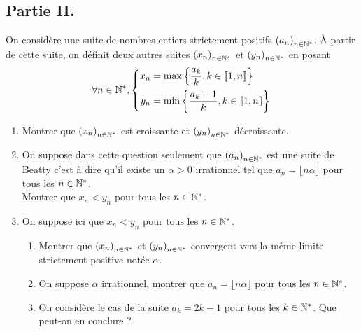 \subsection*{Partie II.}
On considère une suite de nombres entiers strictement positifs $\left( a_n\right) _{n\in \mathbb{N}^*}$. \`A partir de cette suite, on définit deux autres suites $\left( x_n\right) _{n\in \mathbb{N}^*}$ et $\left( y_n\right) _{n\in \mathbb{N}^*}$ en posant
\begin{displaymath}
 \forall n \in \mathbb{N}^*,
\left\lbrace 
\begin{aligned}
 x_n &= \max\left\lbrace \frac{a_k}{k}, k\in \llbracket 1,n \rrbracket \right\rbrace \\ 
 y_n &= \min\left\lbrace \frac{a_k +1}{k}, k\in \llbracket 1,n \rrbracket \right\rbrace 
\end{aligned}
\right. 
\end{displaymath}
\begin{enumerate}
 \item Montrer que $\left( x_n\right) _{n\in \mathbb{N}^*}$ est croissante et $\left( y_n\right) _{n\in \mathbb{N}^*}$ décroissante.
 \item On suppose dans cette question seulement que $\left( a_n\right) _{n\in \mathbb{N}^*}$ est une suite de Beatty c'est à dire qu'il existe un $\alpha>0$ irrationnel tel que $a_n=\lfloor n\alpha \rfloor$ pour tous les $n\in \mathbb{N}^*$.\\
 Montrer que $x_n < y_n$ pour tous les $n\in \mathbb{N}^*$.
 \item On suppose ici que $x_n < y_n$ pour tous les $n\in \mathbb{N}^*$.
\begin{enumerate}
 \item Montrer que  $\left( x_n\right) _{n\in \mathbb{N}^*}$ et $\left( y_n\right) _{n\in \mathbb{N}^*}$ convergent vers la même limite strictement positive notée $\alpha$.

 \item On suppose $\alpha$ irrationnel, montrer que $a_n=\lfloor n\alpha \rfloor$ pour tous les $n\in \mathbb{N}^*$.
 \item On considère le cas de la suite $a_k=2k-1$ pour tous les $k\in\mathbb{N}^*$. Que peut-on en conclure ?
\end{enumerate}
 
\end{enumerate}
